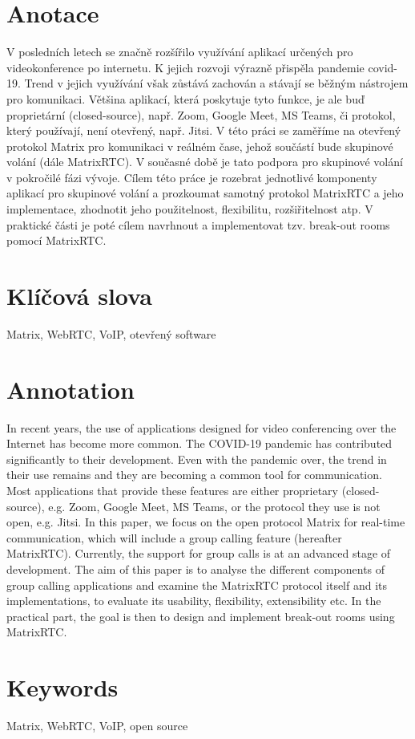\section*{Anotace}
V posledních letech se značně rozšířilo využívání aplikací určených pro
videokonference po internetu. K jejich rozvoji výrazně přispěla pandemie
covid-19. Trend v jejich využívání však zůstává zachován a stávají se běžným
nástrojem pro komunikaci. Většina aplikací, která poskytuje tyto funkce, je ale
buď proprietární (closed-source), např. Zoom, Google Meet, MS Teams, či
protokol, který používají, není otevřený, např. Jitsi. V této práci se zaměříme
na otevřený protokol Matrix pro komunikaci v reálném čase, jehož součástí bude
skupinové volání (dále MatrixRTC). V současné době je tato podpora pro skupinové
volání v pokročilé fázi vývoje. Cílem této práce je rozebrat jednotlivé
komponenty aplikací pro skupinové volání a prozkoumat samotný protokol MatrixRTC
a jeho implementace, zhodnotit jeho použitelnost, flexibilitu, rozšiřitelnost
atp. V praktické části je poté cílem navrhnout a implementovat tzv. break-out
rooms pomocí MatrixRTC.

\section*{Klíčová slova}
Matrix, WebRTC, VoIP, otevřený software

\section*{Annotation}
In recent years, the use of applications designed for video conferencing over
the Internet has become more common. The COVID-19 pandemic has contributed
significantly to their development. Even with the pandemic over, the trend in
their use remains and they are becoming a common tool for communication. Most
applications that provide these features are either proprietary (closed-source),
e.g. Zoom, Google Meet, MS Teams, or the protocol they use is not open, e.g.
Jitsi. In this paper, we focus on the open protocol Matrix for real-time
communication, which will include a group calling feature (hereafter MatrixRTC).
Currently, the support for group calls is at an advanced stage of development.
The aim of this paper is to analyse the different components of group calling
applications and examine the MatrixRTC protocol itself and its implementations,
to evaluate its usability, flexibility, extensibility etc. In the practical
part, the goal is then to design and implement break-out rooms using MatrixRTC.

\section*{Keywords}
Matrix, WebRTC, VoIP, open source
